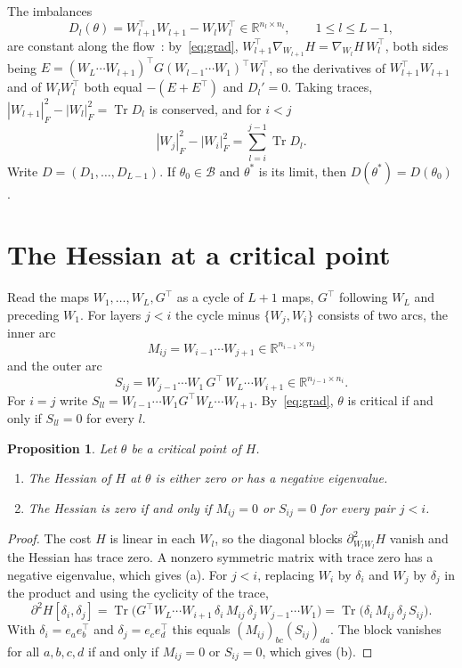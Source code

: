 \documentclass[11pt]{amsart}
\newtheorem{proposition}[theorem]{Proposition}
\theoremstyle{definition}
\theoremstyle{remark}
\numberwithin{equation}{section}
\newcommand{\RR}{\mathbb{R}}
\DeclareMathOperator{\Tr}{Tr}
\begin{document}
The imbalances
\[
D_l(\theta)=W_{l+1}^\top W_{l+1}-W_lW_l^\top\in\RR^{n_l\times n_l},\qquad 1\le l\le L-1,
\]
are constant along the flow~\cite{ACH,DHL}: by~\eqref{eq:grad}, $W_{l+1}^\top\nabla_{W_{l+1}}H=\nabla_{W_l}H\,W_l^\top$, both sides being $E=(W_L\cdots W_{l+1})^\top G(W_{l-1}\cdots W_1)^\top W_l^\top$, so the derivatives of $W_{l+1}^\top W_{l+1}$ and of $W_lW_l^\top$ both equal $-(E+E^\top)$ and $D_l'=0$. Taking traces, $|W_{l+1}|_F^2-|W_l|_F^2=\Tr D_l$ is conserved, and for $i<j$
\begin{equation}\label{eq:telescope}
|W_j|_F^2-|W_i|_F^2=\sum_{l=i}^{j-1}\Tr D_l .
\end{equation}
Write $D=(D_1,\dots,D_{L-1})$. If $\theta_0\in\mathcal{B}$ and $\theta^*$ is its limit, then $D(\theta^*)=D(\theta_0)$.

\section{The Hessian at a critical point}\label{sec:hessian}
Read the maps $W_1,\dots,W_L,G^\top$ as a cycle of $L+1$ maps, $G^\top$ following $W_L$ and preceding $W_1$. For layers $j<i$ the cycle minus $\{W_j,W_i\}$ consists of two arcs, the inner arc
\[
M_{ij}=W_{i-1}\cdots W_{j+1}\in\RR^{n_{i-1}\times n_j}
\]
and the outer arc
\[
S_{ij}=W_{j-1}\cdots W_1\,G^\top\,W_L\cdots W_{i+1}\in\RR^{n_{j-1}\times n_i}.
\]
For $i=j$ write $S_{ll}=W_{l-1}\cdots W_1G^\top W_L\cdots W_{l+1}$. By~\eqref{eq:grad}, $\theta$ is critical if and only if $S_{ll}=0$ for every $l$.

\begin{proposition}\label{prop:hess}
Let $\theta$ be a critical point of $H$.
\begin{enumerate}[label=(\alph*)]
\item The Hessian of $H$ at $\theta$ is either zero or has a negative eigenvalue.
\item The Hessian is zero if and only if $M_{ij}=0$ or $S_{ij}=0$ for every pair $j<i$.
\end{enumerate}
\end{proposition}
\begin{proof}
The cost $H$ is linear in each $W_l$, so the diagonal blocks $\partial^2_{W_lW_l}H$ vanish and the Hessian has trace zero. A nonzero symmetric matrix with trace zero has a negative eigenvalue, which gives (a). For $j<i$, replacing $W_i$ by $\delta_i$ and $W_j$ by $\delta_j$ in the product and using the cyclicity of the trace,
\[
\partial^2H[\delta_i,\delta_j]=\Tr\bigl(G^\top W_L\cdots W_{i+1}\,\delta_i\,M_{ij}\,\delta_j\,W_{j-1}\cdots W_1\bigr)=\Tr\bigl(\delta_i\,M_{ij}\,\delta_j\,S_{ij}\bigr).
\]
With $\delta_i=e_ae_b^\top$ and $\delta_j=e_ce_d^\top$ this equals $(M_{ij})_{bc}(S_{ij})_{da}$. The block vanishes for all $a,b,c,d$ if and only if $M_{ij}=0$ or $S_{ij}=0$, which gives (b).
\end{proof}
\end{document}
